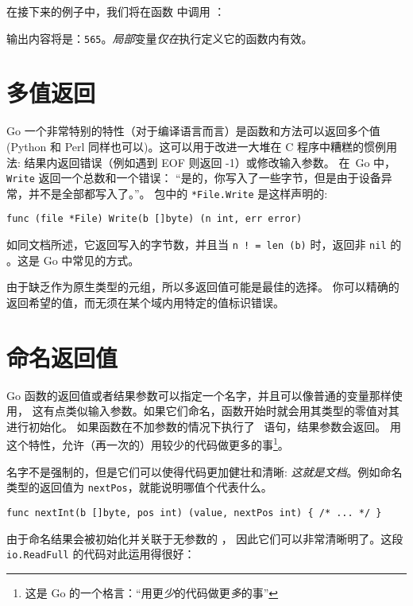 在接下来的例子中，我们将在函数  中调用 ：



输出内容将是：\texttt{565}。\emph{局部}变量\emph{仅在}执行定义它的函数内有效。

\section{多值返回}
\label{sec:multiple return}
Go 一个非常特别的特性（对于编译语言而言）是函数和方法可以返回多个值(Python
和 Perl 同样也可以)。这可以用于改进一大堆在 C 程序中糟糕的惯例用法:
结果内返回错误（例如遇到 EOF 则返回 -1）或修改输入参数。
在~Go 中，\lstinline{Write} 返回一个总数和一个错误：
“是的，你写入了一些字节，但是由于设备异常，并不是全部都写入了。”。
 包中的 \lstinline{*File.Write} 是这样声明的:
\begin{lstlisting}
func (file *File) Write(b []byte) (n int, err error)
\end{lstlisting}
如同文档所述，它返回写入的字节数，并且当 \lstinline{n ! = len (b)} 时，返回非 
\lstinline{nil} 的 。这是 Go 中常见的方式。

由于缺乏作为原生类型的元组，所以多返回值可能是最佳的选择。
你可以精确的返回希望的值，而无须在某个域内用特定的值标识错误。

\section{命名返回值}
\label{sec:named result parameters}
Go 函数的返回值或者结果参数可以指定一个名字，并且可以像普通的变量那样使用，
这有点类似输入参数。如果它们命名，函数开始时就会用其类型的零值对其进行初始化。
如果函数在不加参数的情况下执行了~ 语句，结果参数会返回。
用这个特性，允许（再一次的）用较少的代码做更多的事\footnote{这是 Go 的一个格言：``用更\emph{少}的代码做更\emph{多}的事''}。

名字不是强制的，但是它们可以使得代码更加健壮和清晰: 
\emph{这就是文档}。例如命名  类型的返回值为 \lstinline{nextPos}，就能说明哪值个代表什么。

\begin{lstlisting}
func nextInt(b []byte, pos int) (value, nextPos int) { /* ... */ }
\end{lstlisting}
由于命名结果会被初始化并关联于无参数的 ，
因此它们可以非常清晰明了。这段 \lstinline{io.ReadFull} 的代码对此运用得很好：

